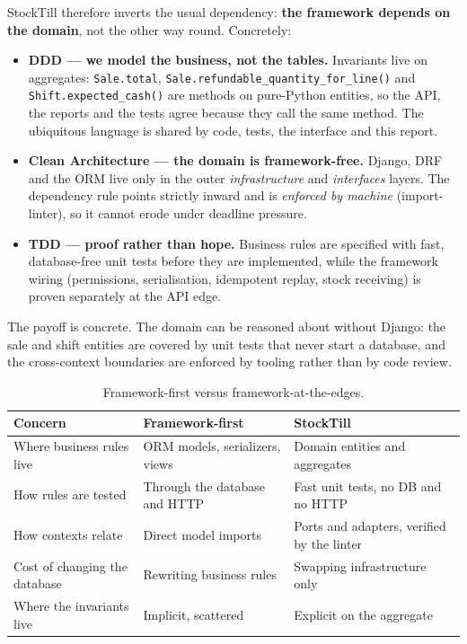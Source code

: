 \documentclass[11pt,a4paper]{article}
\begin{document}
StockTill therefore inverts the usual dependency: \textbf{the framework depends on the domain}, not the
other way round. Concretely:

\begin{itemize}[leftmargin=1.4em]
  \item \textbf{DDD --- we model the business, not the tables.} Invariants live on aggregates:
  \texttt{Sale.total}, \texttt{Sale.refundable\_quantity\_for\_line()} and \texttt{Shift.expected\_cash()}
  are methods on pure-Python entities, so the API, the reports and the tests agree because they call the
  same method. The ubiquitous language is shared by code, tests, the interface and this report.
  \item \textbf{Clean Architecture --- the domain is framework-free.} Django, DRF and the ORM live only
  in the outer \emph{infrastructure} and \emph{interfaces} layers. The dependency rule points strictly
  inward and is \emph{enforced by machine} (import-linter), so it cannot erode under deadline pressure.
  \item \textbf{TDD --- proof rather than hope.} Business rules are specified with fast, database-free
  unit tests before they are implemented, while the framework wiring (permissions, serialisation,
  idempotent replay, stock receiving) is proven separately at the API edge.
\end{itemize}

The payoff is concrete. The domain can be reasoned about without Django: the sale and shift entities
are covered by unit tests that never start a database, and the cross-context boundaries are enforced by
tooling rather than by code review.

\begin{table}[htbp]\centering
\small
\caption{Framework-first versus framework-at-the-edges.}
\begin{tabular}{@{}p{}p{}p{}@{}}
\toprule
\textbf{Concern} & \textbf{Framework-first} & \textbf{StockTill} \\
\midrule
Where business rules live & ORM models, serializers, views & Domain entities and aggregates \\
How rules are tested & Through the database and HTTP & Fast unit tests, no DB and no HTTP \\
How contexts relate & Direct model imports & Ports and adapters, verified by the linter \\
Cost of changing the database & Rewriting business rules & Swapping infrastructure only \\
Where the invariants live & Implicit, scattered & Explicit on the aggregate \\
\bottomrule
\end{tabular}
\end{table}
\end{document}
